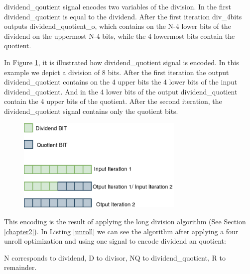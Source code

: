 dividend\_qoutient signal encodes two variables of the division. In the first dividend\_quotient is equal to the dividend. After the first iteration div\_4bits outputs dividend\_quotient\_o, which contains on the N-4 lower bits of the dividend on the uppermost N-4 bits, while the 4 lowermost bits contain the quotient.

In Figure \ref{fig:div}, it is illustrated how dividend\_quotient signal is encoded. In this example we depict a division of 8 bits. After the first iteration the output dividend\_quotient contains on the 4 upper bits the 4 lower bits of the input dividend\_quotient. And in the 4 lower bits of the output dividend\_quotient contain the 4 upper bits of the quotient. After the second iteration, the dividend\_quotient signal contains only the quotient bits.


\begin{figure}[h]
\centering
\includegraphics[width=8cm]{DIV.png}
\label{fig:div}
\end{figure}

This encoding is the result of applying the long division algorithm (See Section \ref{chapter2}). In Listing \ref{unroll} we can see the algorithm after applying a four unroll optimization and using one signal to encode dividend an quotient:

N corresponds to dividend, D to divisor, NQ to dividend\_quotient, R to remainder.

